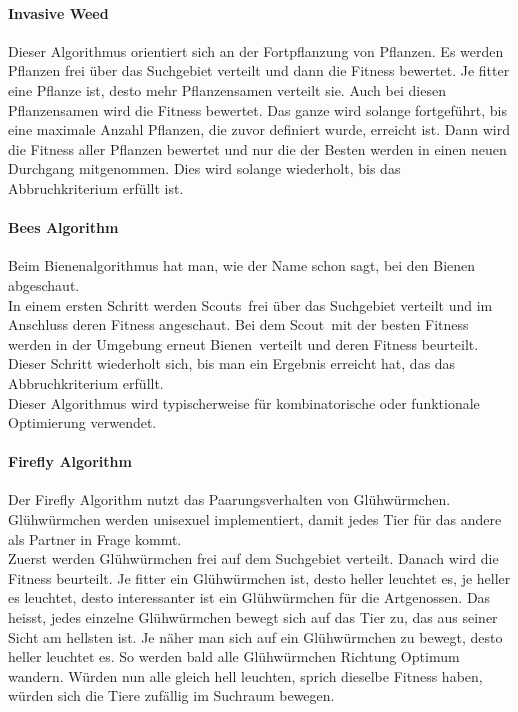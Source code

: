 		\paragraph{Invasive Weed}
		$\;$ \\
		Dieser Algorithmus orientiert sich an der Fortpflanzung von Pflanzen. Es werden Pflanzen frei über das Suchgebiet verteilt und dann die Fitness bewertet. Je fitter eine Pflanze ist, desto mehr Pflanzensamen verteilt sie. Auch bei diesen Pflanzensamen wird die Fitness bewertet. Das ganze wird solange fortgeführt, bis eine maximale Anzahl Pflanzen, die zuvor definiert wurde, erreicht ist. Dann wird die Fitness aller Pflanzen bewertet und nur die der Besten werden in einen neuen Durchgang mitgenommen. Dies wird solange wiederholt, bis das Abbruchkriterium erfüllt ist.
				
		
		\paragraph{Bees Algorithm}
		$\;$ \\
		Beim Bienenalgorithmus hat man, wie der Name schon sagt, bei den Bienen abgeschaut.\\
		In einem ersten Schritt werden \textacutedbl Scouts\textacutedbl \ frei über das Suchgebiet verteilt und im Anschluss deren Fitness angeschaut. Bei dem \textacutedbl Scout\textacutedbl \ mit der besten Fitness werden in der Umgebung erneut \textacutedbl Bienen\textacutedbl \ verteilt und deren Fitness beurteilt. Dieser Schritt wiederholt sich, bis man ein Ergebnis erreicht hat, das das Abbruchkriterium erfüllt.\\Dieser Algorithmus wird typischerweise für kombinatorische oder funktionale Optimierung verwendet.
		
		\paragraph{Firefly Algorithm} 
		$\;$ \\
		Der Firefly Algorithm nutzt das Paarungsverhalten von Glühwürmchen. Glühwürmchen werden unisexuel implementiert, damit jedes Tier für das andere als Partner in Frage kommt. \\
		Zuerst werden Glühwürmchen frei auf dem Suchgebiet verteilt. Danach wird die Fitness beurteilt. Je fitter ein Glühwürmchen ist, desto heller leuchtet es, je heller es leuchtet, desto interessanter ist ein Glühwürmchen für die Artgenossen. Das heisst, jedes einzelne Glühwürmchen bewegt sich auf das Tier zu, das aus seiner Sicht am hellsten ist. Je näher man sich auf ein Glühwürmchen zu bewegt, desto heller leuchtet es. So werden bald alle Glühwürmchen Richtung Optimum wandern. Würden nun alle gleich hell leuchten, sprich dieselbe Fitness haben, würden sich die Tiere zufällig im Suchraum bewegen.
		